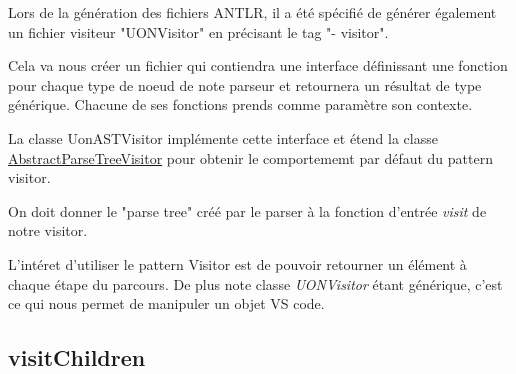 \documentclass[
    iict, %
    il, %
]{heig-tb}
\begin{document}



Lors de la génération des fichiers ANTLR, il a été spécifié de générer également un fichier visiteur "UONVisitor" en précisant le tag "- visitor".

Cela va nous créer un fichier qui contiendra une interface définissant une fonction pour chaque type de noeud de note parseur et retournera un résultat de type générique.
Chacune de ses fonctions prends comme paramètre son contexte.


La classe UonASTVisitor implémente cette interface et étend la classe \href{https://www.antlr.org/api/Java/org/antlr/v4/runtime/tree/AbstractParseTreeVisitor.html}{AbstractParseTreeVisitor}
pour obtenir le comportememt par défaut du pattern visitor.

On doit donner le "parse tree" créé par le parser à la fonction d'entrée \emph{visit} de notre visitor. %

L'intéret d'utiliser le pattern Visitor est de pouvoir retourner un élément à chaque étape du parcours.
De plus note classe \emph{UONVisitor} étant générique, c'est ce qui nous permet de manipuler un objet VS code.



\subsection{visitChildren}
\end{document}
